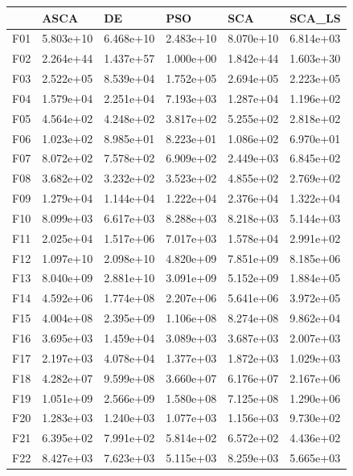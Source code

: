 \begin{tabular}{llllll}
\toprule
{} &       ASCA &         DE &        PSO &        SCA &     SCA\_LS \\
\midrule
F01  &  5.803e+10 &  6.468e+10 &  2.483e+10 &  8.070e+10 &  6.814e+03 \\
F02  &  2.264e+44 &  1.437e+57 &  1.000e+00 &  1.842e+44 &  1.603e+30 \\
F03  &  2.522e+05 &  8.539e+04 &  1.752e+05 &  2.694e+05 &  2.223e+05 \\
F04  &  1.579e+04 &  2.251e+04 &  7.193e+03 &  1.287e+04 &  1.196e+02 \\
F05  &  4.564e+02 &  4.248e+02 &  3.817e+02 &  5.255e+02 &  2.818e+02 \\
F06  &  1.023e+02 &  8.985e+01 &  8.223e+01 &  1.086e+02 &  6.970e+01 \\
F07  &  8.072e+02 &  7.578e+02 &  6.909e+02 &  2.449e+03 &  6.845e+02 \\
F08  &  3.682e+02 &  3.232e+02 &  3.523e+02 &  4.855e+02 &  2.769e+02 \\
F09  &  1.279e+04 &  1.144e+04 &  1.222e+04 &  2.376e+04 &  1.322e+04 \\
F10  &  8.099e+03 &  6.617e+03 &  8.288e+03 &  8.218e+03 &  5.144e+03 \\
F11  &  2.025e+04 &  1.517e+06 &  7.017e+03 &  1.578e+04 &  2.991e+02 \\
F12  &  1.097e+10 &  2.098e+10 &  4.820e+09 &  7.851e+09 &  8.185e+06 \\
F13  &  8.040e+09 &  2.881e+10 &  3.091e+09 &  5.152e+09 &  1.884e+05 \\
F14  &  4.592e+06 &  1.774e+08 &  2.207e+06 &  5.641e+06 &  3.972e+05 \\
F15  &  4.004e+08 &  2.395e+09 &  1.106e+08 &  8.274e+08 &  9.862e+04 \\
F16  &  3.695e+03 &  1.459e+04 &  3.089e+03 &  3.687e+03 &  2.007e+03 \\
F17  &  2.197e+03 &  4.078e+04 &  1.377e+03 &  1.872e+03 &  1.029e+03 \\
F18  &  4.282e+07 &  9.599e+08 &  3.660e+07 &  6.176e+07 &  2.167e+06 \\
F19  &  1.051e+09 &  2.566e+09 &  1.580e+08 &  7.125e+08 &  1.290e+06 \\
F20  &  1.283e+03 &  1.240e+03 &  1.077e+03 &  1.156e+03 &  9.730e+02 \\
F21  &  6.395e+02 &  7.991e+02 &  5.814e+02 &  6.572e+02 &  4.436e+02 \\
F22  &  8.427e+03 &  7.623e+03 &  5.115e+03 &  8.259e+03 &  5.665e+03 \\

\end{tabular}
